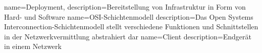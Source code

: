 {
        name=Deployment,
        description={Bereitstellung von Infrastruktur in Form von Hard- und Software}
}
{
        name=OSI-Schichtenmodell
        description={Das Open Systems Interconnection-Schichtenmodell stellt verschiedene Funktionen und Schnittstellen in der Netzwerkvermittlung abstrahiert dar}
}
{
        name=Client
        description={Endgerät in einem Netzwerk}
}
